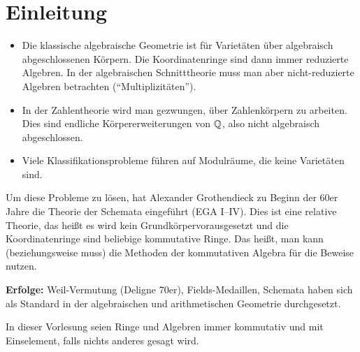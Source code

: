 
\chapter{Einleitung}
\begin{itemize}
	\item Die klassische algebraische Geometrie ist für Varietäten über algebraisch abgeschlossenen Körpern. Die Koordinatenringe sind dann immer reduzierte Algebren. In der algebraischen Schnitttheorie muss man aber nicht-reduzierte Algebren betrachten (\enquote{Multiplizitäten}).
	\item In der Zahlentheorie wird man gezwungen, über Zahlenkörpern zu arbeiten. Dies sind endliche Körpererweiterungen von $\mathbb {Q}$, also nicht algebraisch abgeschlossen.
	\item Viele Klassifikationsprobleme führen auf Modulräume, die keine Varietäten sind.
\end{itemize}
Um diese Probleme zu lösen, hat Alexander Grothendieck zu Beginn der 60er Jahre die Theorie der Schemata eingeführt (EGA I--IV). Dies ist eine relative Theorie, das heißt es wird kein Grundkörpervorausgesetzt und die Koordinatenringe sind beliebige kommutative Ringe. Das heißt, man kann (beziehungsweise muss) die Methoden der kommutativen Algebra für die Beweise nutzen.

\textbf{Erfolge:} Weil-Vermutung (Deligne 70er), Fields-Medaillen, Schemata haben sich als Standard in der algebraischen und arithmetischen Geometrie durchgesetzt.

In dieser Vorlesung seien Ringe und Algebren immer kommutativ und mit Einselement, falls nichts anderes gesagt wird.
